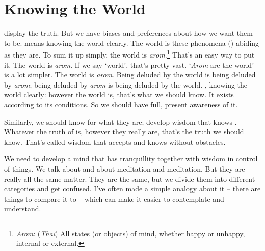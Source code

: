 
\renewcommand{\chapterFootnotemark}{\footnotemark}
\renewcommand{\chapterFootnotetext}{\footnotetext{\textit{Note}: This talk has been published elsewhere under the title: `\textit{Seeking the Source}'}}

\chapter{Knowing the World}

 display the truth. But we have biases and preferences about how we want them to be.  means knowing the world clearly. The world is these phenomena () abiding as they are. To sum it up simply, the world is \textit{arom}.\footnote{\textit{Arom}: (\textit{Thai}) All states (or objects) of mind, whether happy or unhappy, internal or external.} That's an easy way to put it. The world is \textit{arom}. If we say `world', that's pretty vast. `\textit{Arom} are the world' is a lot simpler. The world is \textit{arom}. Being deluded by the world is being deluded by \textit{arom}; being deluded by \textit{arom} is being deluded by the world. , knowing the world clearly: however the world is, that's what we should know. It exists according to its conditions. So we should have full, present awareness of it.

Similarly, we should know  for what they are; develop wisdom that knows . Whatever the truth of  is, however they really are, that's the truth we should know. That's called wisdom that accepts and knows without obstacles.

We need to develop a mind that has tranquillity together with wisdom in control of things. We talk about    and about  meditation and  meditation. But they are really all the same matter. They are the same, but we divide them into different categories and get confused. I've often made a simple analogy about it -- there are things to compare it to -- which can make it easier to contemplate and understand.

